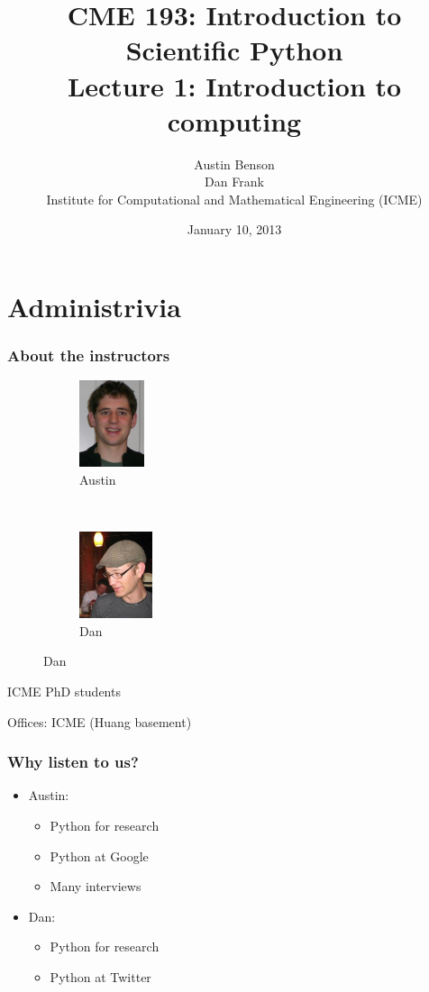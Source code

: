 \documentclass{beamer}
\title{CME 193: Introduction to Scientific Python \\
Lecture 1: Introduction to computing}
\author{Austin Benson \\
\vspace{0.1in}
Dan Frank \\
\vspace{0.1in}
Institute for Computational and Mathematical Engineering (ICME)}
\date{January 10, 2013}
\begin{document}
\maketitle

\section{Administrivia}
\begin{frame}
\frametitle{About the instructors}

\begin{figure}
        \centering
	\begin{subfigure}[b]{0.45\textwidth}
	\centering
	\includegraphics[height=1in]{"images/austin"}
	\caption{Austin}
	\label{fig:hw2_15a}
	\end{subfigure}
        ~ %
	\begin{subfigure}[b]{0.45\textwidth}
	\centering
	\includegraphics[height=1in]{"images/dan"}
	\caption{Dan}
	\label{fig:hw2_15b}
	\end{subfigure}
\end{figure}

ICME PhD students

Offices: ICME (Huang basement)
\end{frame}

\begin{frame}
\frametitle{Why listen to us?}

\begin{itemize}
\setlength{\itemsep}{0.2in}
\item{Austin:
\begin{itemize}
\setlength{\itemsep}{0.05in}
\item{Python for research}
\item{Python at Google}
\item{Many interviews}
\end{itemize}
}
\item{Dan:
\begin{itemize}
\setlength{\itemsep}{0.05in}
\item{Python for research}
\item{Python at Twitter}
\end{itemize}
}
\end{itemize}

\end{frame}
\end{document}
